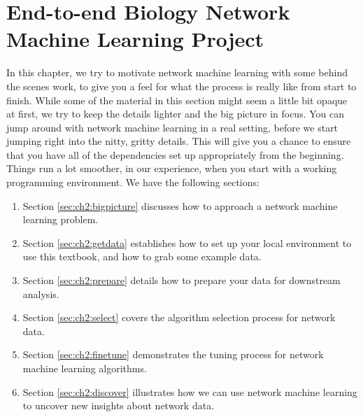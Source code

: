 \chapter{End-to-end Biology Network Machine Learning Project}
\label{sec:ch2}

In this chapter, we try to motivate network machine learning with some behind the scenes work, to give you a feel for what the process is really like from start to finish. While some of the material in this section might seem a little bit opaque at first, we try to keep the details lighter and the big picture in focus. You can jump around with network machine learning in a real setting, before we start jumping right into the nitty, gritty details. This will give you a chance to ensure that you have all of the dependencies set up appropriately from the beginning. Things run a lot smoother, in our experience, when you start with a working programming environment. We have the following sections:
\begin{enumerate}
    \item Section \ref{sec:ch2:bigpicture} discusses how to approach a network machine learning problem.
    \item Section \ref{sec:ch2:getdata} establishes how to set up your local environment to use this textbook, and how to grab some example data. 
    \item Section \ref{sec:ch2:prepare} details how to prepare your data for downstream analysis.
    \item Section \ref{sec:ch2:select} covers the algorithm selection process for network data.
    \item Section \ref{sec:ch2:finetune} demonstrates the tuning process for network machine learning algorithms.
    \item Section \ref{sec:ch2:discover} illustrates how we can use network machine learning to uncover new insights about network data.
\end{enumerate}

\newpage 









